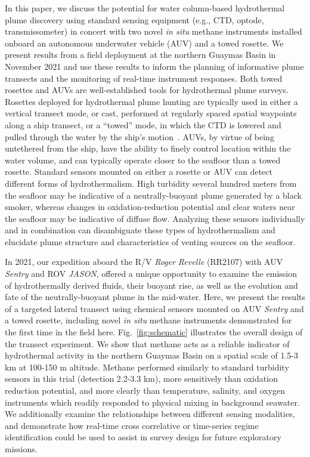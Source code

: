In this paper, we discuss the potential for water column-based hydrothermal plume discovery using standard sensing equipment (e.g., CTD, optode, transmissometer) in concert with two novel \emph{in situ} methane instruments installed onboard an autonomous underwater vehicle (AUV) and a towed rosette. We present results from a field deployment at the northern Guaymas Basin in November 2021 and use these results to inform the planning of informative plume transects and the monitoring of real-time instrument responses. Both towed rosettes and AUVs are well-established tools for hydrothermal plume surveys. Rosettes deployed for hydrothermal plume hunting are typically used in either a vertical transect mode, or cast, performed at regularly spaced spatial waypoints along a ship transect, or a ``towed'' mode, in which the CTD is lowered and pulled through the water by the ship’s motion~\autocite{chin1994situ, bennett2013trophic}. AUVs, by virtue of being untethered from the ship, have the ability to finely control location within the water volume, and can typically operate closer to the seafloor than a towed rosette. Standard sensors mounted on either a rosette or AUV can detect different forms of hydrothermalism. High turbidity several hundred meters from the seafloor may be indicative of a neutrally-buoyant plume generated by a black smoker, whereas changes in oxidation-reduction potential and clear waters near the seafloor may be indicative of diffuse flow. Analyzing these sensors individually and in combination can disambiguate these types of hydrothermalism and elucidate plume structure and characteristics of venting sources on the seafloor.

In 2021, our expedition aboard the R/V \emph{Roger Revelle} (RR2107) with AUV \emph{Sentry} and ROV \emph{JASON}, offered a unique opportunity to examine the emission of hydrothermally derived fluids, their buoyant rise, as well as the evolution and fate of the neutrally-buoyant plume in the mid-water. Here, we present the results of a targeted lateral transect using chemical sensors mounted on AUV \emph{Sentry} and a towed rosette, including novel \emph{in situ} methane instruments demonstrated for the first time in the field here. Fig.~\ref{fig:schematic} illustrates the overall design of the transect experiment. We show that methane acts as a reliable indicator of hydrothermal activity in the northern Guaymas Basin on a spatial scale of 1.5-3 km at 100-150 m altitude. Methane performed similarly to standard turbidity sensors in this trial (detection 2.2-3.3 km), more sensitively than oxidation reduction potential, and more clearly than temperature, salinity, and oxygen instruments which readily responded to physical mixing in background seawater. We additionally examine the relationships between different sensing modalities, and demonstrate how real-time cross correlative or time-series regime identification could be used to assist in survey design for future exploratory missions. 

